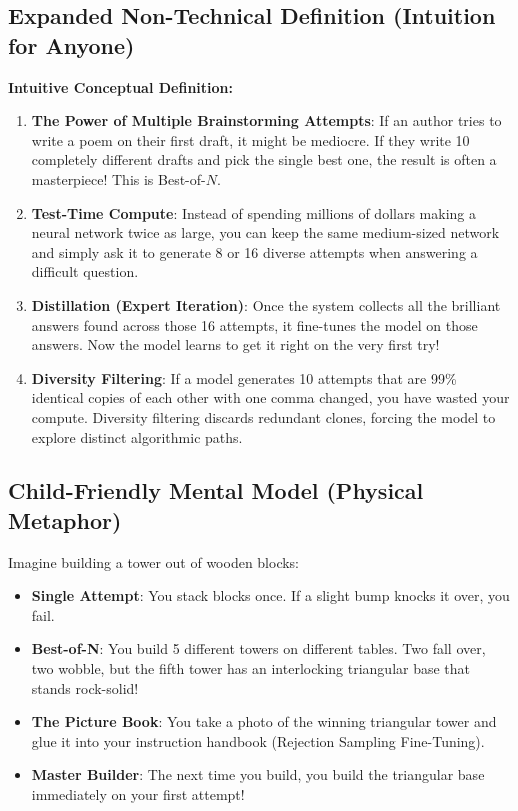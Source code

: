 \documentclass[11pt,a4paper]{article}
\theoremstyle{definition}
\begin{document}
\subsection{Expanded Non-Technical Definition (Intuition for Anyone)}
\textbf{Intuitive Conceptual Definition:}
\begin{enumerate}
    \item \textbf{The Power of Multiple Brainstorming Attempts}: If an author tries to write a poem on their first draft, it might be mediocre. If they write 10 completely different drafts and pick the single best one, the result is often a masterpiece! This is Best-of-$N$.
    \item \textbf{Test-Time Compute}: Instead of spending millions of dollars making a neural network twice as large, you can keep the same medium-sized network and simply ask it to generate 8 or 16 diverse attempts when answering a difficult question.
    \item \textbf{Distillation (Expert Iteration)}: Once the system collects all the brilliant answers found across those 16 attempts, it fine-tunes the model on those answers. Now the model learns to get it right on the very first try!
    \item \textbf{Diversity Filtering}: If a model generates 10 attempts that are 99\% identical copies of each other with one comma changed, you have wasted your compute. Diversity filtering discards redundant clones, forcing the model to explore distinct algorithmic paths.
\end{enumerate}

\subsection{Child-Friendly Mental Model (Physical Metaphor)}
Imagine building a tower out of wooden blocks:
\begin{itemize}
    \item \textbf{Single Attempt}: You stack blocks once. If a slight bump knocks it over, you fail.
    \item \textbf{Best-of-N}: You build 5 different towers on different tables. Two fall over, two wobble, but the fifth tower has an interlocking triangular base that stands rock-solid!
    \item \textbf{The Picture Book}: You take a photo of the winning triangular tower and glue it into your instruction handbook (Rejection Sampling Fine-Tuning).
    \item \textbf{Master Builder}: The next time you build, you build the triangular base immediately on your first attempt!
\end{itemize}
\end{document}
